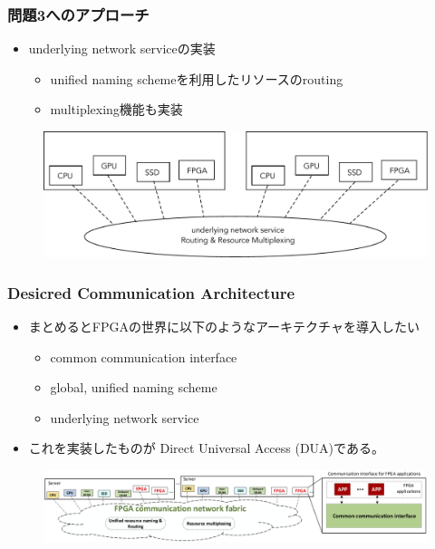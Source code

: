 \documentclass[dvipdfmx,9pt,notheorems]{beamer}
\theoremstyle{definition}
\begin{document}
\begin{frame}\frametitle{問題3へのアプローチ}
	\begin{itemize}
		\item underlying network serviceの実装
		\begin{itemize}
		  \item unified naming schemeを利用したリソースのrouting
			\item multiplexing機能も実装
		\end{itemize}
	\end{itemize}
  \begin{figure}[htb]
		\includegraphics[width=\linewidth]{fig/ez_FPGA_mux_routing.pdf}
  \end{figure}
	\pnote{
	}
\end{frame}

\begin{frame}\frametitle{Desicred Communication Architecture}
	\begin{itemize}
		\item まとめるとFPGAの世界に以下のようなアーキテクチャを導入したい
			\begin{itemize}
				\item common communication interface
				\item global, unified naming scheme
				\item underlying network service
			\end{itemize}
		\item これを実装したものが{\color{red} Direct Universal Access (DUA)}である。
	\end{itemize}
  \begin{figure}[htb]
		\includegraphics[width=\linewidth]{fig/figure1b.png}
  \end{figure}
	\pnote{
	}
\end{frame}
\end{document}
